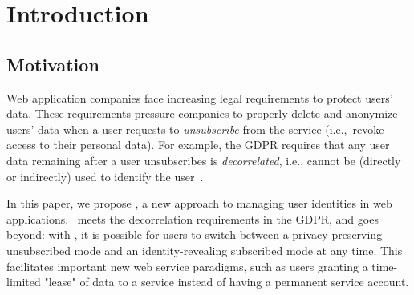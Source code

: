 \section{Introduction}

\subsection{Motivation} 

Web application companies face increasing legal requirements to protect users’ data. These
requirements pressure companies to properly delete and anonymize users' data when a user requests to
\emph{unsubscribe} from the service (i.e.,\ revoke access to their personal data).
For example, the GDPR requires that any user data remaining after a user unsubscribes is
\emph{decorrelated}, i.e., cannot be (directly or indirectly) used to identify the user~\cite{gdpr}.  

In this paper, we propose \sys, a new approach to managing user identities in web applications.
\sys~meets the decorrelation requirements in the GDPR, and goes beyond: with \sys, it is possible
for users to switch between a privacy-preserving unsubscribed mode and an identity-revealing
subscribed mode at any time. This facilitates important new web service paradigms, such as users
granting a time-limited "lease" of data to a service instead of having a permanent service account.


